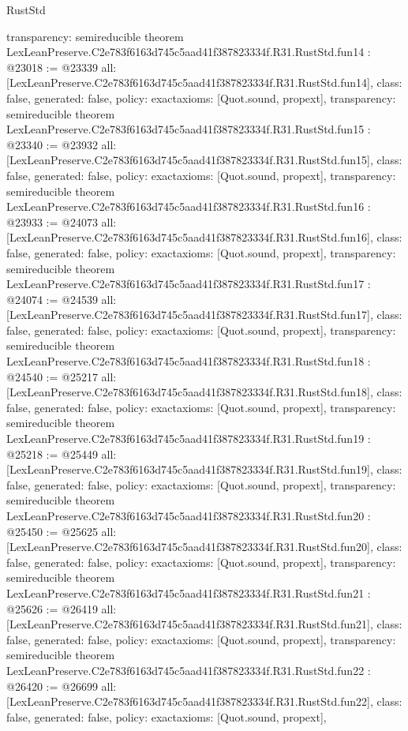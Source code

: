 \begin{lexlean}{RustStd}
\begin{coremodule}
{  transparency: semireducible
}
theorem LexLeanPreserve.C2e783f6163d745c5aad41f387823334f.R31.RustStd.fun14 : @23018 := @23339 {
  all: [LexLeanPreserve.C2e783f6163d745c5aad41f387823334f.R31.RustStd.fun14],
  class: false,
  generated: false,
  policy: exact{axioms: [Quot.sound, propext]},
  transparency: semireducible
}
theorem LexLeanPreserve.C2e783f6163d745c5aad41f387823334f.R31.RustStd.fun15 : @23340 := @23932 {
  all: [LexLeanPreserve.C2e783f6163d745c5aad41f387823334f.R31.RustStd.fun15],
  class: false,
  generated: false,
  policy: exact{axioms: [Quot.sound, propext]},
  transparency: semireducible
}
theorem LexLeanPreserve.C2e783f6163d745c5aad41f387823334f.R31.RustStd.fun16 : @23933 := @24073 {
  all: [LexLeanPreserve.C2e783f6163d745c5aad41f387823334f.R31.RustStd.fun16],
  class: false,
  generated: false,
  policy: exact{axioms: [Quot.sound, propext]},
  transparency: semireducible
}
theorem LexLeanPreserve.C2e783f6163d745c5aad41f387823334f.R31.RustStd.fun17 : @24074 := @24539 {
  all: [LexLeanPreserve.C2e783f6163d745c5aad41f387823334f.R31.RustStd.fun17],
  class: false,
  generated: false,
  policy: exact{axioms: [Quot.sound, propext]},
  transparency: semireducible
}
theorem LexLeanPreserve.C2e783f6163d745c5aad41f387823334f.R31.RustStd.fun18 : @24540 := @25217 {
  all: [LexLeanPreserve.C2e783f6163d745c5aad41f387823334f.R31.RustStd.fun18],
  class: false,
  generated: false,
  policy: exact{axioms: [Quot.sound, propext]},
  transparency: semireducible
}
theorem LexLeanPreserve.C2e783f6163d745c5aad41f387823334f.R31.RustStd.fun19 : @25218 := @25449 {
  all: [LexLeanPreserve.C2e783f6163d745c5aad41f387823334f.R31.RustStd.fun19],
  class: false,
  generated: false,
  policy: exact{axioms: [Quot.sound, propext]},
  transparency: semireducible
}
theorem LexLeanPreserve.C2e783f6163d745c5aad41f387823334f.R31.RustStd.fun20 : @25450 := @25625 {
  all: [LexLeanPreserve.C2e783f6163d745c5aad41f387823334f.R31.RustStd.fun20],
  class: false,
  generated: false,
  policy: exact{axioms: [Quot.sound, propext]},
  transparency: semireducible
}
theorem LexLeanPreserve.C2e783f6163d745c5aad41f387823334f.R31.RustStd.fun21 : @25626 := @26419 {
  all: [LexLeanPreserve.C2e783f6163d745c5aad41f387823334f.R31.RustStd.fun21],
  class: false,
  generated: false,
  policy: exact{axioms: [Quot.sound, propext]},
  transparency: semireducible
}
theorem LexLeanPreserve.C2e783f6163d745c5aad41f387823334f.R31.RustStd.fun22 : @26420 := @26699 {
  all: [LexLeanPreserve.C2e783f6163d745c5aad41f387823334f.R31.RustStd.fun22],
  class: false,
  generated: false,
  policy: exact{axioms: [Quot.sound, propext]},
}
\end{coremodule}
\end{lexlean}
